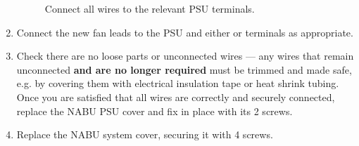 \begin{enumerate}
\begin{figure}[h!]
		\caption{Connect all wires to the relevant PSU terminals.}
		\label{fig:terminals}
	\end{figure}
	\item Connect the new fan leads to the PSU  and either  or  terminals as appropriate.
	\item Check there are no loose parts or unconnected wires --- any wires that remain unconnected \textbf{and are no longer required} must be trimmed and made safe, e.g. by covering them with electrical insulation tape or heat shrink tubing. Once you are satisfied that all wires are correctly and securely connected, replace the NABU PSU cover and fix in place with its 2 screws.
	\item Replace the NABU system cover, securing it with 4 screws.
\end{enumerate}
